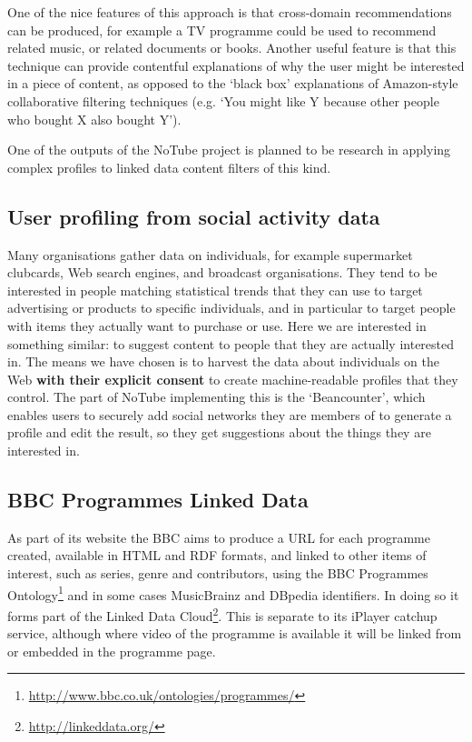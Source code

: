 \documentclass[]{article}%
\begin{document}
One of the nice features of this approach is that cross-domain recommendations can be produced, for example a TV programme could be used to recommend related music, or related documents or books. Another useful feature is that this technique can provide contentful explanations of why the user might be interested in a piece of content, as opposed to the `black box' explanations of Amazon-style collaborative filtering techniques (e.g. `You might like Y because other people who bought X also bought Y').

One of the outputs of the NoTube project is planned to be research in applying complex profiles to linked data content filters of this kind. 

\subsection{User profiling from social activity data}

Many organisations gather data on individuals, for example supermarket clubcards, Web search engines, and broadcast organisations. They tend to be interested in people matching statistical trends that they can use to target advertising or products to specific individuals, and in particular to target people with items they actually want to purchase or use. Here we are interested in something similar: to suggest content to people that they are actually interested in. The means we have chosen is to harvest the data about individuals on the Web {\bf with their explicit consent} to create machine-readable profiles that they control. The part of NoTube implementing this is the `Beancounter', which enables users to securely add social networks they are members of to generate a profile and edit the result, so they get suggestions about the things they are interested in.

\subsection{BBC Programmes Linked Data}

As part of its website the BBC aims to produce a URL for each programme created, available in HTML and RDF formats, and linked to other items of interest, such as series, genre and contributors, using the BBC Programmes Ontology\footnote{\url{http://www.bbc.co.uk/ontologies/programmes/}} and in some cases MusicBrainz and DBpedia identifiers. In doing so it forms part of the Linked Data Cloud\footnote{\url{http://linkeddata.org/}}. This is separate to its iPlayer catchup service, although where video of the programme is available it will be linked from or embedded in the programme page.
\end{document}
